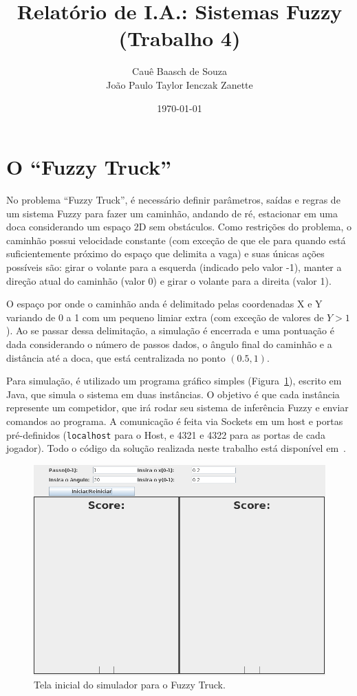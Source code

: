 \documentclass[twocolumn]{article}
\title{Relatório de I.A.: Sistemas Fuzzy (Trabalho 4)}
\author{Cauê Baasch de Souza \\
        João Paulo Taylor Ienczak Zanette}
\date{\today}
\begin{document}
    \maketitle{}

    \section{O ``Fuzzy Truck''}

    No problema ``Fuzzy Truck'', é necessário definir parâmetros, saídas e
    regras de um sistema Fuzzy para fazer um caminhão, andando de ré,
    estacionar em uma doca considerando um espaço 2D sem obstáculos. Como
    restrições do problema, o caminhão possui velocidade constante (com exceção
    de que ele para quando está suficientemente próximo do espaço que delimita
    a vaga) e suas únicas ações possíveis são: girar o volante para a esquerda
    (indicado pelo valor -1), manter a direção atual do caminhão (valor 0) e
    girar o volante para a direita (valor 1).

    O espaço por onde o caminhão anda é delimitado pelas coordenadas X e Y
    variando de 0 a 1 com um pequeno limiar extra (com exceção de valores de $Y
    > 1$). Ao se passar dessa delimitação, a simulação é encerrada e uma
    pontuação é dada considerando o número de passos dados, o ângulo final do
    caminhão e a distância até a doca, que está centralizada no ponto $(0.5,
    1)$.

    Para simulação, é utilizado um programa gráfico simples
    (Figura~\ref{simulator}), escrito em Java, que simula o sistema em duas
    instâncias. O objetivo é que cada instância represente um competidor, que
    irá rodar seu sistema de inferência Fuzzy e enviar comandos ao programa. A
    comunicação é feita via Sockets em um host e portas pré-definidos
    (\texttt{localhost} para o Host, e 4321 e 4322 para as portas de cada
    jogador). Todo o código da solução realizada neste trabalho está disponível
    em~\cite{oficial-repo}.

    \begin{figure}[ht]
        \includegraphics[keepaspectratio,width=.5\textwidth]{img/fuzzytruck-initial}
        \caption{Tela inicial do simulador para o Fuzzy Truck.\label{simulator}}
    \end{figure}
\end{document}
